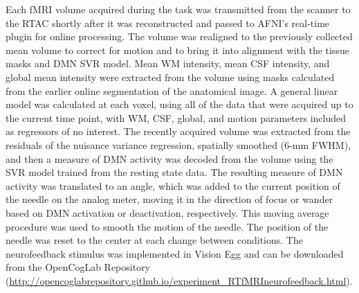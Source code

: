Each fMRI volume acquired during the task was transmitted from the scanner to the RTAC shortly after it was reconstructed and passed to AFNI’s real-time plugin \cite{Cox1995} for online processing. The volume was realigned to the previously collected mean volume to correct for motion and to bring it into alignment with the tissue masks and DMN SVR model. Mean WM intensity, mean CSF intensity, and global mean intensity were extracted from the volume using masks calculated from the earlier online segmentation of the anatomical image. A general linear model was calculated at each voxel, using all of the data that were acquired up to the current time point, with WM, CSF, global, and motion parameters included as regressors of no interest. The recently acquired volume was extracted from the residuals of the nuisance variance regression, spatially smoothed (6-mm FWHM), and then a measure of DMN activity was decoded from the volume using the SVR model trained from the resting state data. The resulting measure of DMN activity was translated to an angle, which was added to the current position of the needle on the analog meter, moving it in the direction of focus or wander based on DMN activation or deactivation, respectively. This moving average procedure was used to smooth the motion of the needle. The position of the needle was reset to the center at each change between conditions. The neurofeedback stimulus was implemented in Vision Egg \cite{Straw2008} and can be downloaded from the OpenCogLab Repository (\url{http://opencoglabrepository.github.io/experiment\_RTfMRIneurofeedback.html}).

